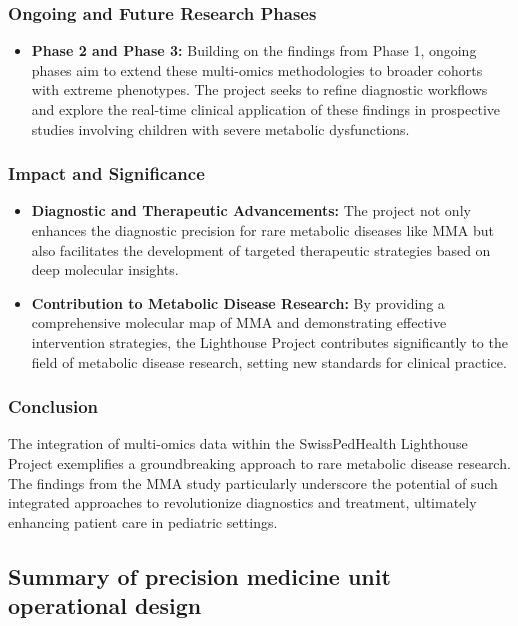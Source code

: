\subsubsection*{Ongoing and Future Research Phases}
\begin{itemize}
    \item \textbf{Phase 2 and Phase 3:} Building on the findings from Phase 1, ongoing phases aim to extend these multi-omics methodologies to broader cohorts with extreme phenotypes. The project seeks to refine diagnostic workflows and explore the real-time clinical application of these findings in prospective studies involving children with severe metabolic dysfunctions.
\end{itemize}

\subsubsection*{Impact and Significance}
\begin{itemize}
    \item \textbf{Diagnostic and Therapeutic Advancements:} The project not only enhances the diagnostic precision for rare metabolic diseases like MMA but also facilitates the development of targeted therapeutic strategies based on deep molecular insights.
    \item \textbf{Contribution to Metabolic Disease Research:} By providing a comprehensive molecular map of MMA and demonstrating effective intervention strategies, the Lighthouse Project contributes significantly to the field of metabolic disease research, setting new standards for clinical practice.
\end{itemize}

\subsubsection*{Conclusion}
The integration of multi-omics data within the SwissPedHealth Lighthouse Project exemplifies a groundbreaking approach to rare metabolic disease research. The findings from the MMA study particularly underscore the potential of such integrated approaches to revolutionize diagnostics and treatment, ultimately enhancing patient care in pediatric settings.



 \subsection{Summary of  precision medicine unit operational design}
